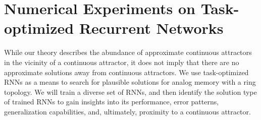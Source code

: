 \documentclass{article} %
\newcommand{\mpcomment}[1]{\textcolor{mpcolor}{(#1)}}
\newcounter{ct}
\theoremstyle{definition}
\theoremstyle{remark}
\begin{document}

\section{Numerical Experiments on Task-optimized Recurrent Networks}\label{sec:experiments}

While our theory describes the abundance of approximate continuous attractors in the vicinity of a continuous attractor, it does not imply that there are no approximate solutions away from continuous attractors.
We use task-optimized RNNs as a means to search for plausible solutions for analog memory with a ring topology.
We will train a diverse set of RNNs, and then identify the solution type of trained RNNs to gain insights into its performance, error patterns, generalization capabilities, and, ultimately, proximity to a continuous attractor.
\end{document}
